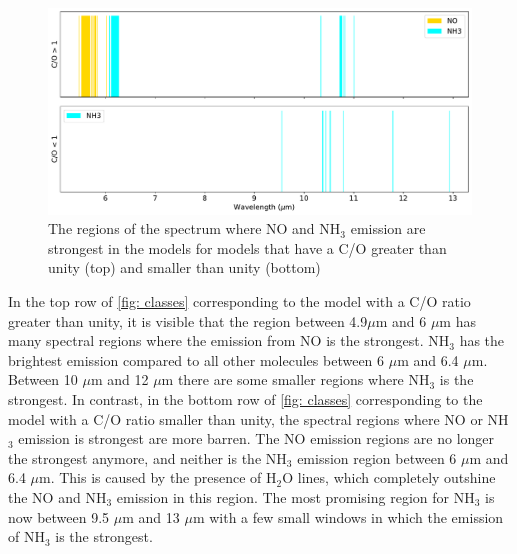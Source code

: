 \documentclass[oneside, single, authoryear, semicolon, 12pt]{lion-msc}
\newcommand{\4}{$_4$}
\newcommand{\3}{$_3$}
\newcommand{\2}{$_2$}
\begin{document}


\begin{figure}[H]
    \centering
    \includegraphics[width=\linewidth]{Figures/ClassificationCO.pdf}
    \caption{The regions of the spectrum where NO and NH\3 emission are strongest in the models for models that have a C/O greater than unity (top) and smaller than unity (bottom)}
    \label{fig: classes}
\end{figure}

In the top row of \autoref{fig: classes} corresponding to the model with a C/O ratio greater than unity, it is visible that the region between 4.9$\mu$m and 6 $\mu$m has many spectral regions where the emission from NO is the strongest. NH\3 has the brightest emission compared to all other molecules between 6 $\mu$m and 6.4 $\mu$m. Between 10 $\mu$m and 12 $\mu$m there are some smaller regions where NH\3 is the strongest. In contrast, in the bottom row of \autoref{fig: classes} corresponding to the model with a C/O ratio smaller than unity, the spectral regions where NO or NH\3 emission is strongest are more barren. The NO emission regions are no longer the strongest anymore, and neither is the NH\3 emission region between 6 $\mu$m and 6.4 $\mu$m. This is caused by the presence of H\2O lines, which completely outshine the NO and NH\3 emission in this region. The most promising region for NH\3 is now between 9.5 $\mu$m and 13 $\mu$m with a few small windows in which the emission of NH\3 is the strongest.
\end{document}
